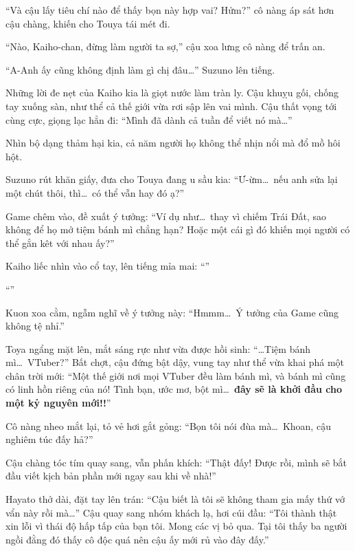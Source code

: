 \documentclass[../main.tex]{subfiles}
\begin{document}
``Và cậu lấy tiêu chí nào để thấy bọn này hợp vai? Hửm?'' cô nàng áp sát hơn cậu chàng, khiến cho Touya tái mét đi.

``Nào, Kaiho-chan, đừng làm người ta sợ,'' cậu xoa lưng cô nàng để trấn an.

``A-Anh ấy cũng không định làm gì chị đâu\dots'' Suzuno lên tiếng.

Những lời đe nẹt của Kaiho kia là giọt nước làm tràn ly. Cậu khuỵu gối, chống tay xuống sàn, như thể cả thế giới vừa rơi sập lên vai mình. Cậu thất vọng tới cùng cực, giọng lạc hẳn đi: ``Mình đã dành cả tuần để viết nó mà\dots''

Nhìn bộ dạng thảm hại kia, cả năm người họ không thể nhịn nổi mà đổ mồ hôi hột.

Suzuno rút khăn giấy, đưa cho Touya đang u sầu kia: ``Ư-ừm\dots\ nếu anh sửa lại một chút thôi, thì\dots\ có thể vẫn hay đó ạ?''

Game chêm vào, đề xuất ý tưởng: ``Ví dụ như\dots\ thay vì chiếm Trái Đất, sao không để họ mở tiệm bánh mì chẳng hạn? Hoặc một cái gì đó khiến mọi người có thể gắn kêt với nhau ấy?''

Kaiho liếc nhìn vào cổ tay, lên tiếng mỉa mai: ``''

``''

Kuon xoa cằm, ngẫm nghĩ về ý tưởng này: ``Hmmm\dots\ Ý tưởng của Game cũng không tệ nhỉ.''

Toya ngẩng mặt lên, mắt sáng rực như vừa được hồi sinh: ``\dots Tiệm bánh mì\dots\ VTuber?'' Bất chợt, cậu đứng bật dậy, vung tay như thể vừa khai phá một chân trời mới: ``Một thế giới nơi mọi VTuber đều làm bánh mì, và bánh mì cũng có linh hồn riêng của nó! Tình bạn, ước mơ, bột mì\dots\ \textbf{đây sẽ là khởi đầu cho một kỷ nguyên mới!!}''

Cô nàng nheo mắt lại, tỏ vẻ hơi gắt gỏng: ``Bọn tôi nói đùa mà\dots\ Khoan, cậu nghiêm túc đấy hả?''

Cậu chàng tóc tím quay sang, vẫn phấn khích: ``Thật đấy! Được rồi, mình sẽ bắt đầu viết kịch bản phần mới ngay sau khi về nhà!''

Hayato thở dài, đặt tay lên trán: ``Cậu biết là tôi sẽ không tham gia mấy thứ vớ vẩn này rồi mà\dots'' Cậu quay sang nhóm khách lạ, hơi cúi đầu: ``Tôi thành thật xin lỗi vì thái độ hấp tấp của bạn tôi. Mong các vị bỏ qua. Tại tôi thấy ba người ngồi đằng đó thấy cô độc quá nên cậu ấy mới rủ vào đây đấy.''
\end{document}
